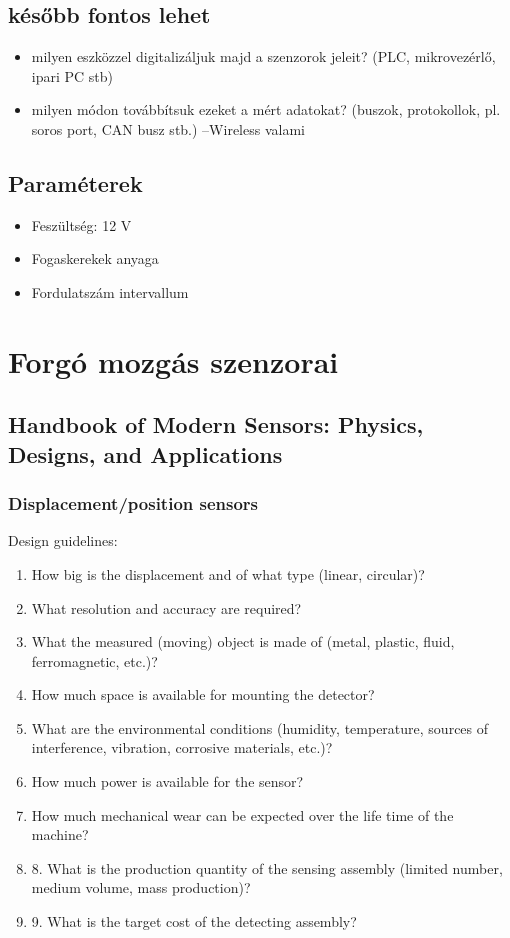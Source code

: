 \documentclass{article}
\begin{document}
	\subsection{később fontos lehet}
	\begin{itemize}
		\item milyen eszközzel digitalizáljuk majd a szenzorok jeleit? (PLC, mikrovezérlő, ipari PC stb)
		\item milyen módon továbbítsuk ezeket a mért adatokat? (buszok, protokollok, pl. soros port, CAN busz stb.) --Wireless valami
	\end{itemize}
	
	\subsection{Paraméterek}
	\begin{itemize}
		\item Feszültség: 12 V
		\item Fogaskerekek anyaga
		\item Fordulatszám intervallum
		
	\end{itemize}
	
	
	
	\section{Forgó mozgás szenzorai}
	
	\subsection{Handbook of Modern Sensors: Physics, Designs, and Applications}
	\subsubsection{Displacement/position sensors}
	Design guidelines:
	\begin{enumerate}
		\item How big is the displacement and of what type (linear, circular)?
		\item What resolution and accuracy are required?
		\item What the measured (moving) object is made of (metal, plastic, fluid, ferromagnetic, etc.)?
		\item How much space is available for mounting the detector?
		\item What are the environmental conditions (humidity, temperature, sources of
		interference, vibration, corrosive materials, etc.)?
		\item How much power is available for the sensor?
		\item How much mechanical wear can be expected over the life time of the machine?
		\item 8. What is the production quantity of the sensing assembly (limited number,
		medium volume, mass production)?
		\item 9. What is the target cost of the detecting assembly?
	\end{enumerate}
	
\end{document}
